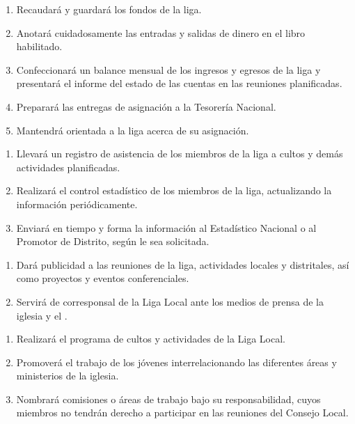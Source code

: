 \begin{enumerate}
    \item Recaudará y guardará los fondos de la liga.
    \item Anotará cuidadosamente las entradas y salidas de dinero en el libro habilitado.
    \item Confeccionará un balance mensual de los ingresos y egresos de la liga y presentará el informe del estado de las cuentas en las reuniones planificadas.
    \item Preparará las entregas de asignación a la Tesorería Nacional.
    \item Mantendrá orientada a la liga acerca de su asignación.
\end{enumerate}

\begin{enumerate}
    \item Llevará un registro de asistencia de los miembros de la liga a cultos y demás actividades planificadas.
    \item Realizará el control estadístico de los miembros de la liga, actualizando la información periódicamente.
    \item Enviará en tiempo y forma la información al Estadístico Nacional o al Promotor de Distrito, según le sea solicitada.
\end{enumerate}

\begin{enumerate}
    \item Dará publicidad a las reuniones de la liga, actividades locales y distritales, así como proyectos y eventos conferenciales.
    \item Servirá de corresponsal de la Liga Local ante los medios de prensa de la iglesia y el \OOLMJ{}.
\end{enumerate}

\begin{enumerate}
    \item Realizará el programa de cultos y actividades de la Liga Local.
    \item Promoverá el trabajo de los jóvenes interrelacionando las diferentes áreas y ministerios de la iglesia.
    \item Nombrará comisiones o áreas de trabajo bajo su responsabilidad, cuyos miembros no tendrán derecho a participar en las reuniones del Consejo Local.
\end{enumerate}

